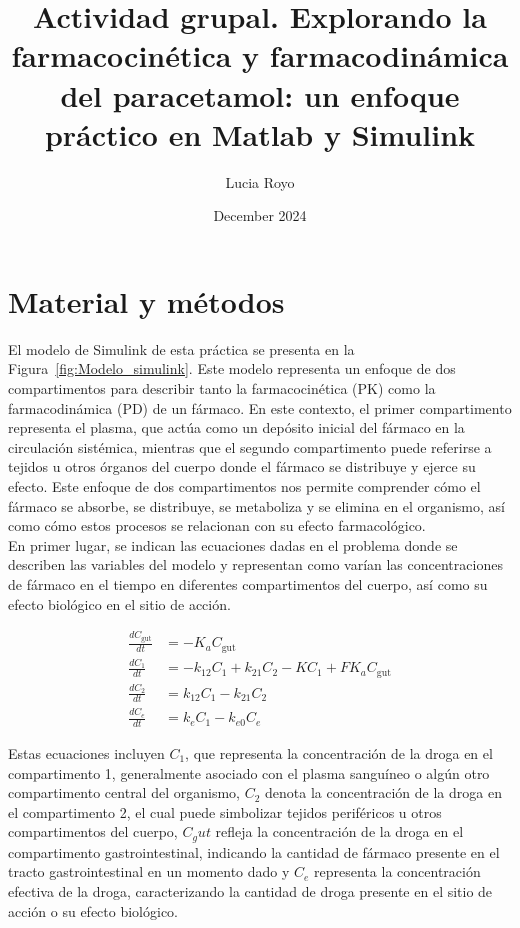 \documentclass{article}
\title{Actividad grupal. Explorando la farmacocinética y farmacodinámica del paracetamol: un enfoque práctico en Matlab y Simulink}
\author{Lucia Royo}
\date{December 2024}
\begin{document}
\maketitle

\section{Material y métodos}
El modelo de Simulink de esta práctica se presenta en la Figura~\ref{fig:Modelo_simulink}. Este modelo representa un enfoque de dos compartimentos para describir tanto la farmacocinética (PK) como la farmacodinámica (PD) de un fármaco. En este contexto, el primer compartimento representa el plasma, que actúa como un depósito inicial del fármaco en la circulación sistémica, mientras que el segundo compartimento puede referirse a tejidos u otros órganos del cuerpo donde el fármaco se distribuye y ejerce su efecto. Este enfoque de dos compartimentos nos permite comprender cómo el fármaco se absorbe, se distribuye, se metaboliza y se elimina en el organismo, así como cómo estos procesos se relacionan con su efecto farmacológico.\\

En primer lugar, se indican las ecuaciones dadas en el problema donde se describen las variables del modelo y representan como varían las concentraciones de fármaco en el tiempo en diferentes compartimentos del cuerpo, así como su efecto biológico en el sitio de acción.

\begin{align*}
\frac{dC_{\text{gut}}}{dt} &= -K_a C_{\text{gut}} \\
\frac{dC_1}{dt} &= -k_{12}C_1 + k_{21}C_2 - KC_1 + F K_a C_{\text{gut}} \\
\frac{dC_2}{dt} &= k_{12}C_1 - k_{21}C_2 \\
\frac{dC_e}{dt} &= k_e C_1 - k_{e0}C_e
\end{align*}

Estas ecuaciones incluyen $C_1$, que representa la concentración de la droga en el compartimento 1, generalmente asociado con el plasma sanguíneo o algún otro compartimento central del organismo, $C_2$ denota la concentración de la droga en el compartimento 2, el cual puede simbolizar tejidos periféricos u otros compartimentos del cuerpo, $C_gut$ refleja la concentración de la droga en el compartimento gastrointestinal, indicando la cantidad de fármaco presente en el tracto gastrointestinal en un momento dado y $C_e$ representa la concentración efectiva de la droga, caracterizando la cantidad de droga presente en el sitio de acción o su efecto biológico.\\
\end{document}
